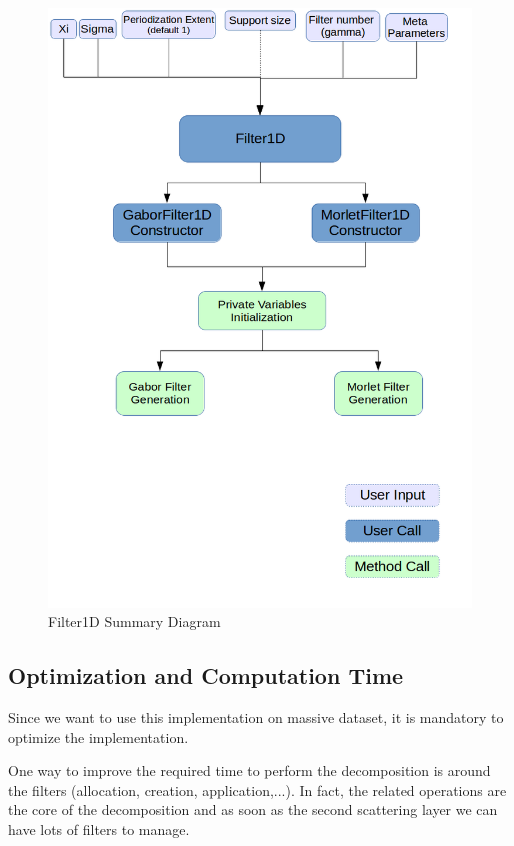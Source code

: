 \documentclass[a4paper]{report}
\begin{document}
\begin{figure}[H]
\begin{center}
\includegraphics[scale=0.31]{filter_diagram.png}\caption{Filter1D Summary Diagram}
\end{center}
\end{figure}
\subsection{Optimization and Computation Time}
Since we want to use this implementation on massive dataset, it is mandatory to optimize the implementation.

One way to improve the required time to perform the decomposition is around the filters (allocation, creation, application,...). In fact, the related operations are the core of the decomposition and as soon as the second scattering layer we can have lots of filters to manage. 
\end{document}
